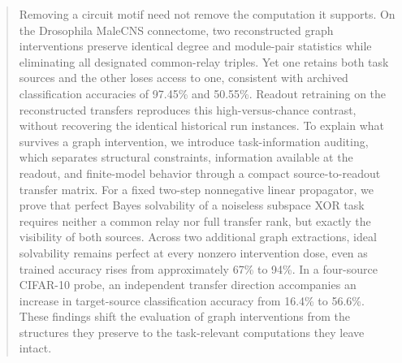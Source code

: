 \begin{abstract}
Removing a circuit motif need not remove the computation it supports. On the
Drosophila MaleCNS connectome, two reconstructed graph interventions preserve
identical degree and module-pair statistics while eliminating all designated
common-relay triples. Yet one retains both task sources and the other loses
access to one, consistent with archived classification accuracies of 97.45\%
and 50.55\%. Readout retraining on the reconstructed transfers reproduces this
high-versus-chance contrast, without recovering the identical historical run
instances. To explain what survives a graph intervention, we introduce
task-information auditing, which separates structural constraints, information
available at the readout, and finite-model behavior through a compact
source-to-readout transfer matrix. For a fixed two-step nonnegative linear
propagator, we prove that perfect Bayes solvability of a noiseless subspace
XOR task requires neither a common relay nor full transfer rank, but exactly
the visibility of both sources. Across two additional graph extractions, ideal
solvability remains perfect at every nonzero intervention dose, even as
trained accuracy rises from approximately 67\% to 94\%. In a four-source
CIFAR-10 probe, an independent transfer direction accompanies an increase in
target-source classification accuracy from 16.4\% to 56.6\%. These findings
shift the evaluation of graph interventions from the structures they preserve
to the task-relevant computations they leave intact.
\end{abstract}

